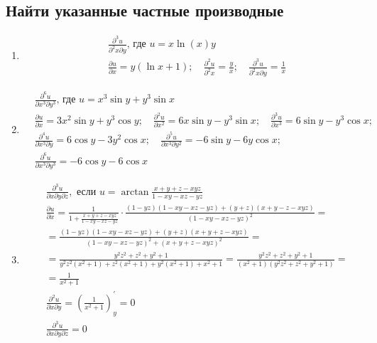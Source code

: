 \documentclass[a4paper, 12pt]{article}
\begin{document}
  \subsection{Найти указанные частные производные}
  \begin{enumerate}
  \item %
  \begin{align*}
    &\frac{\partial^3 u}{\partial^2 x \partial y} \text{, где } u = x\ln{(x)}y \\
    &\frac{\partial u}{\partial x} = y(\ln{x}+1);\quad
    \frac{\partial^2 u}{\partial^2 x} = \frac{y}{x};\quad
    \frac{\partial^3 u}{\partial^2 x \partial y} = \frac{1}{x}
    \end{align*}
  \item %
    \begin{align*}
    &\frac{\partial^6 u}{\partial x^3 \partial y^3} \text{, где } u = 
    x^3\sin y +y^3 \sin x \\
    &\frac{\partial u}{\partial x} = 3x^2\sin y +y^3 \cos y;\quad
    \frac{\partial^2 u}{\partial x^2} = 6x \sin y -y^3 \sin x;\quad
    \frac{\partial^3 u}{\partial x^3} = 6\sin y -y^3\cos x; \\
    &\frac{\partial^4 u}{\partial x^3 \partial y} = 
    6\cos y -3y^2\cos x;\quad
    \frac{\partial^5 u}{\partial x^3 \partial y^2} = 
    -6\sin y -6y\cos x; \\
    &\frac{\partial^6 u}{\partial x^3 \partial y^3} = -6\cos y -6\cos x
    \end{align*}
  \item %
  \begin{align*}
   &\frac{\partial^3 u}{\partial x \partial y \partial z}, \text{ если } u = \arctan \frac{x+y+z-xyz}{1-xy-xz-yz} \\
   &\frac{\partial u}{\partial x} =  \frac{1}{1+\frac{x+y+z-xyz}{1-xy-xz-yz}} \cdot \frac{(1-yz)(1-xy-xz-yz)+(y+z)(x+y-z-xyz)}{(1-xy-xz-yz)^2} = \\
   &=\frac{(1-yz)(1-xy-xz-yz)+(y+z)(x+y+z-xyz)}{(1-xy-xz-yz)^2+(x+y+z-xyz)^2} =  \\
   &=\frac{y^2z^2+z^2+y^2+1}{y^2z^2(x^2+1)+z^2(x^2+1)+y^2(x^2+1)+x^2+1}=\frac{y^2z^2+z^2+y^2+1}{(x^2+1)(y^2z^2+z^2+y^2+1)} = \\
   &= \frac{1}{x^2+1} \\
   &\frac{\partial ^2 u}{\partial x \partial y} = (\frac{1}{x^2+1})_y^{'} = 0 \\
   &\frac{\partial^3 u}{\partial x \partial y \partial z} = 0
  \end{align*}
\end{enumerate}
\end{document}
